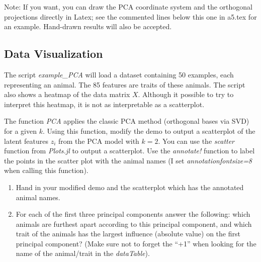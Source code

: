 \documentclass{article}
\def\blu#1{{\color{blu}#1}}
\def\enum#1{\begin{enumerate}#1\end{enumerate}}
\begin{document}
\begin{enumerate}
   Note: If you want, you can draw the PCA coordinate system and the orthogonal projections directly in Latex; see the commented lines below this one in a5.tex for an example. Hand-drawn results will also be accepted.
   
%
%
%


\end{enumerate}
\pagebreak
\subsection{Data Visualization}

The script \emph{example\_PCA} will load a dataset containing 50 examples, each representing an animal. The 85 features are traits of these animals. The script also shows a heatmap of the data matrix $X$. Although it possible to try to interpret this heatmap, it is not as interpretable as a scatterplot.

The function \emph{PCA} applies the classic PCA method (orthogonal bases via SVD) for a given $k$. Using this function, modify the demo to output a scatterplot of the latent features $z_i$ from the PCA model with $k=2$. You can use the \emph{scatter} function from \emph{Plots.jl} to output a scatterplot. Use the \emph{annotate!} function to label the points in the scatter plot with the animal names (I set \emph{annotationfontsize=8} when calling this function).
\blu{
\enum{
\item  Hand in your modified demo and the scatterplot which has the annotated animal names.
\pagebreak
\item For each of the first three principal components answer the following: which animals are furthest apart according to this principal component, and which trait of the animals has the largest influence (absolute value) on the first principal component? (Make sure not to forget the ``+1'' when looking for the name of the animal/trait in the \emph{dataTable}).
}
}
\end{document}

